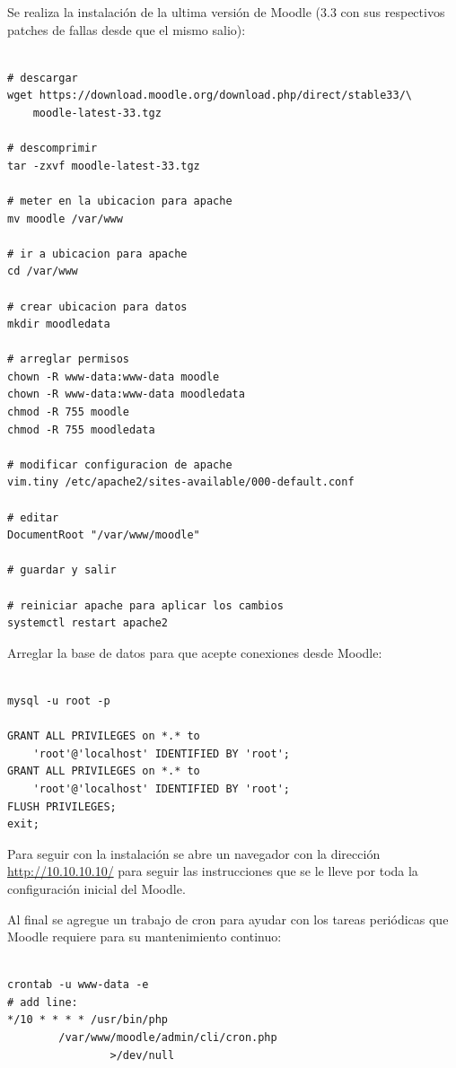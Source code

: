 Se realiza la instalación de la ultima versión de Moodle (3.3 con sus respectivos patches de fallas desde que el mismo salio):

\begin{lstlisting}

# descargar
wget https://download.moodle.org/download.php/direct/stable33/\
	moodle-latest-33.tgz

# descomprimir
tar -zxvf moodle-latest-33.tgz

# meter en la ubicacion para apache
mv moodle /var/www

# ir a ubicacion para apache
cd /var/www

# crear ubicacion para datos
mkdir moodledata

# arreglar permisos
chown -R www-data:www-data moodle
chown -R www-data:www-data moodledata
chmod -R 755 moodle
chmod -R 755 moodledata

# modificar configuracion de apache
vim.tiny /etc/apache2/sites-available/000-default.conf

# editar
DocumentRoot "/var/www/moodle"

# guardar y salir

# reiniciar apache para aplicar los cambios
systemctl restart apache2

\end{lstlisting}

Arreglar la base de datos para que acepte conexiones desde Moodle:

\begin{lstlisting}

mysql -u root -p

GRANT ALL PRIVILEGES on *.* to
	'root'@'localhost' IDENTIFIED BY 'root';
GRANT ALL PRIVILEGES on *.* to
	'root'@'localhost' IDENTIFIED BY 'root';
FLUSH PRIVILEGES;
exit;

\end{lstlisting}

Para seguir con la instalación se abre un navegador con la dirección \url{http://10.10.10.10/} para seguir las instrucciones que se le lleve por toda la configuración inicial del Moodle.

Al final se agregue un trabajo de cron para ayudar con los tareas periódicas que Moodle requiere para su mantenimiento continuo:

\begin{lstlisting}

crontab -u www-data -e
# add line:
*/10 * * * * /usr/bin/php
		/var/www/moodle/admin/cli/cron.php
        		>/dev/null

\end{lstlisting}

